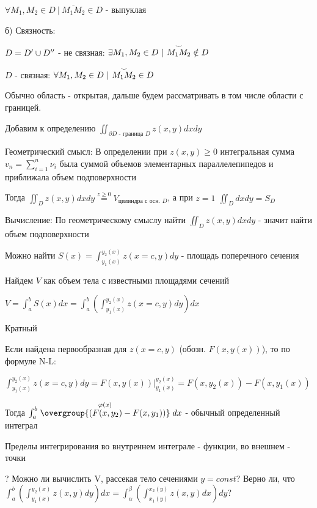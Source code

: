 \documentclass[12pt]{article}
\begin{document}
    $\forall M_1, M_2 \in D \ | \ \overline{M_1 M_2} \in D$ - выпуклая

    б) Связность:

    $D = D^\prime \cup D^{\prime\prime}$ - не связная: $\exists M_1, M_2 \in D \ | \ \overset{\LARGE\smile}{M_1 M_2} \notin D$

    $D$ - связная: $\forall M_1, M_2 \in D \ | \ \overset{\LARGE\smile}{M_1 M_2} \in D$

    Обычно область - открытая, дальше будем рассматривать в том числе области с границей.

    Добавим к определению $\iint_{\partial D \text{ - граница } D} z(x, y) dx dy$

    Геометрический смысл: В определении при $z(x, y) \geq 0$ интегральная сумма $v_n = \sum_{i=1}^n \nu_i$ была суммой объемов элементарных параллелепипедов и приближала объем подповерхности

    Тогда $\iint_D z(x, y) dx dy \stackrel{z \geq 0}{=} V_{\text{цилиндра с осн. } D}$, а при $z = 1$ $\iint_D dx dy = S_D$

    \hypertarget{doubleintegralcalculation}{}

    Вычисление: По геометрическому смыслу найти $\iint_D z(x, y) dx dy$ - значит найти объем подповерхности

    Можно найти $S(x) = \int^{y_2(x)}_{y_1(x)} z(x = c, y) dy$ - площадь поперечного сечения

    Найдем $V$ как объем тела с известными площадями сечений

    $V = \int^b_a S(x) dx = \int_a^b \left(\int^{y_2(x)}_{y_1(x)} z(x = c, y) dy\right) dx$

    \hypertarget{multipleintegral}{}

    \Nota Кратный

    Если найдена первообразная для $z(x = c, y)$ (обозн. $F(x, y(x))$), то по формуле N-L:

    $\int^{y_2(x)}_{y_1(x)} z(x = c, y) dy = F(x, y(x)) \Big|^{y_2(x)}_{y_1(x)} = F(x, y_2(x)) - F(x, y_1(x))$

    Тогда $\int^b_a \stackrel{\varphi(x)}{\overgroup{(F(x, y_2) - F(x, y_1))}} dx$ - обычный определенный интеграл

    Пределы интегрирования во внутреннем интеграле - функции, во внешнем - точки

    ? Можно ли вычислить V, рассекая тело сечениями $y = const$? Верно ли, что $\int_a^b \left(\int_{y_1(x)}^{y_2(x)} z(x, y) dy\right) dx = \int_\alpha^\beta \left(\int_{x_1(y)}^{x_2(y)} z(x, y) dx\right) dy$?
\end{document}
